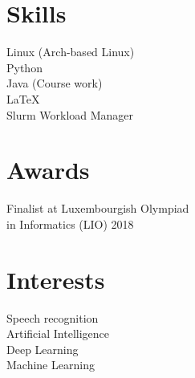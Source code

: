 \documentclass[]{curriculumvitae}
\begin{document}
\begin{minipage}[t]{0.34\textwidth}
\section{Skills}
Linux (Arch-based Linux)\\
Python\\
Java (Course work)\\
LaTeX\\
Slurm Workload Manager\\
\sectionsep

\section{Awards}
Finalist at Luxembourgish Olympiad\\
in Informatics (LIO) 2018
\sectionsep

\section{Interests}
Speech recognition\\
Artificial Intelligence\\
Deep Learning\\
Machine Learning
\sectionsep



\end{minipage}
\hfill
\end{document}
